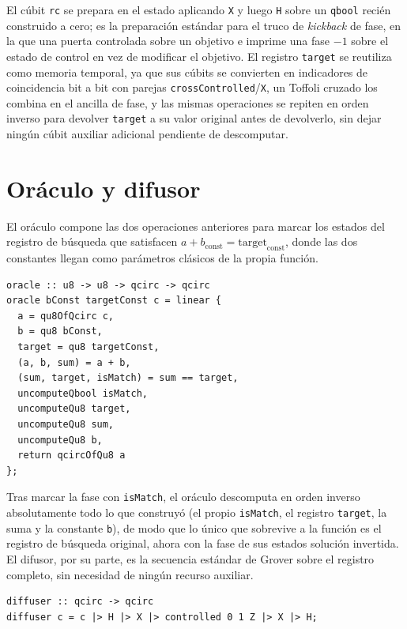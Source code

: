 El cúbit \lstinline|rc| se prepara en el estado aplicando \lstinline|X| y luego \lstinline|H| sobre un \lstinline|qbool| recién construido a cero; es la preparación estándar para el truco de \textit{kickback} de fase, en la que una puerta controlada sobre un objetivo e imprime una fase $-1$ sobre el estado de control en vez de modificar el objetivo. El registro \lstinline|target| se reutiliza como memoria temporal, ya que sus cúbits se convierten en indicadores de coincidencia bit a bit con parejas \lstinline|crossControlled|/\lstinline|X|, un Toffoli cruzado los combina en el ancilla de fase, y las mismas operaciones se repiten en orden inverso para devolver \lstinline|target| a su valor original antes de devolverlo, sin dejar ningún cúbit auxiliar adicional pendiente de descomputar.

\section{Oráculo y difusor}
\label{sec:grover-oraculo}

El oráculo compone las dos operaciones anteriores para marcar los estados del registro de búsqueda que satisfacen $a + b_\text{const} = \text{target}_\text{const}$, donde las dos constantes llegan como parámetros clásicos de la propia función.

\begin{lstlisting}[language={}, caption=Oráculo que compone la suma y la comparación de igualdad]
oracle :: u8 -> u8 -> qcirc -> qcirc
oracle bConst targetConst c = linear {
  a = qu8OfQcirc c,
  b = qu8 bConst,
  target = qu8 targetConst,
  (a, b, sum) = a + b,
  (sum, target, isMatch) = sum == target,
  uncomputeQbool isMatch,
  uncomputeQu8 target,
  uncomputeQu8 sum,
  uncomputeQu8 b,
  return qcircOfQu8 a
};
\end{lstlisting}

Tras marcar la fase con \lstinline|isMatch|, el oráculo descomputa en orden inverso absolutamente todo lo que construyó (el propio \lstinline|isMatch|, el registro \lstinline|target|, la suma y la constante \lstinline|b|), de modo que lo único que sobrevive a la función es el registro de búsqueda original, ahora con la fase de sus estados solución invertida. El difusor, por su parte, es la secuencia estándar de Grover sobre el registro completo, sin necesidad de ningún recurso auxiliar.

\begin{lstlisting}[language={}, caption=Difusor de Grover sobre el registro de búsqueda]
diffuser :: qcirc -> qcirc
diffuser c = c |> H |> X |> controlled 0 1 Z |> X |> H;
\end{lstlisting}

